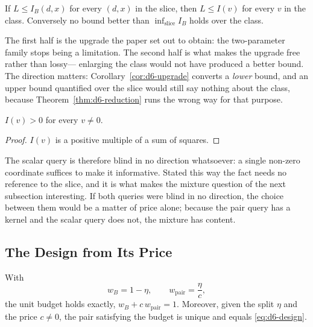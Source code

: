 \begin{corollary}
\label{cor:d6-upgrade}
If $L\le I_{B}(d,x)$ for every $(d,x)$ in the slice, then $L\le I(v)$ for every $v$ in the
class. Conversely no bound better than $\inf_{\text{slice}}I_{B}$ holds over the class.
\end{corollary}

The first half is the upgrade the paper set out to obtain: the two-parameter family stops
being a limitation. The second half is what makes the upgrade free rather than lossy---
enlarging the class would not have produced a better bound. The direction matters:
Corollary~\ref{cor:d6-upgrade} converts a \emph{lower} bound, and an upper bound quantified over
the slice would still say nothing about the class, because Theorem~\ref{thm:d6-reduction} runs
the wrong way for that purpose.

\begin{theorem}
\label{thm:d6-nonblind}
$I(v)>0$ for every $v\neq0$.
\end{theorem}

\begin{proof}
$I(v)$ is a positive multiple of a sum of squares.
\end{proof}


The scalar query is therefore blind in no direction whatsoever: a single non-zero coordinate
suffices to make it informative. Stated this way the fact needs no reference to the slice, and
it is what makes the mixture question of the next subsection interesting. If both queries were
blind in no direction, the choice between them would be a matter of price alone; because the
pair query has a kernel and the scalar query does not, the mixture has content.

\subsection{The Design from Its Price}
\label{sec:d6-design}

\begin{theorem}
\label{thm:d6-unique}
With
\begin{equation}
w_{B}=1-\eta,\qquad
w_{\mathrm{pair}}=\frac{\eta}{c},
\label{eq:d6-design}
\end{equation}
the unit budget holds exactly, $w_{B}+c\,w_{\mathrm{pair}}=1$. Moreover, given the split
$\eta$ and the price $c\neq0$, the pair satisfying the budget is unique and equals
\eqref{eq:d6-design}.
\end{theorem}

